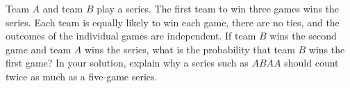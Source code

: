 Team $A$ and team $B$ play a series. The first team to win three games wins the series. Each team is equally likely to win each game, there are no ties, and the outcomes of the individual games are independent. If team $B$ wins the second game and team $A$ wins the series, what is the probability that team $B$ wins the first game? In your solution, explain why a series such as $ABAA$ should count twice as much as a five-game series.
